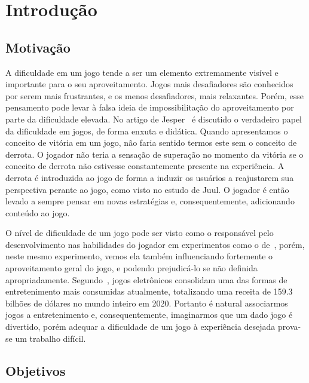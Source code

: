 
\chapter{Introdução}
\label{cap:introducao}
\section{Motivação}

A dificuldade em um jogo tende a ser um elemento extremamente visível e importante para o seu aproveitamento. Jogos mais desafiadores são conhecidos por serem mais frustrantes, e os menos desafiadores, mais relaxantes. Porém, esse pensamento pode levar à falsa ideia de impossibilitação do aproveitamento por parte da dificuldade elevada. No artigo de Jesper~\citet{FearOfFailing} é discutido o verdadeiro papel da dificuldade em jogos, de forma enxuta e didática. Quando apresentamos o conceito de vitória em um jogo, não faria sentido termos este sem o conceito de derrota. O jogador não teria a sensação de superação no momento da vitória se o conceito de derrota não estivesse constantemente presente na experiência. A derrota é introduzida ao jogo de forma a induzir os usuários a reajustarem sua perspectiva perante ao jogo, como visto no estudo de Juul. O jogador é então levado a sempre pensar em novas estratégias e, consequentemente, adicionando conteúdo ao jogo.

O nível de dificuldade de um jogo pode ser visto como o responsável pelo desenvolvimento nas habilidades do jogador em experimentos como o de~\citet{ExperimentalValidation}, porém, neste mesmo experimento, vemos ela também influenciando fortemente o aproveitamento geral do jogo, e podendo prejudicá-lo se não definida apropriadamente. Segundo~\citet{VideoGameBusiness}, jogos eletrônicos consolidam uma das formas de entretenimento mais consumidas atualmente, totalizando uma receita de 159.3 bilhões de dólares no mundo inteiro em 2020. Portanto é natural associarmos jogos a entretenimento e, consequentemente, imaginarmos que um dado jogo é divertido, porém adequar a dificuldade de um jogo à experiência desejada prova-se um trabalho difícil.

\section{Objetivos}

